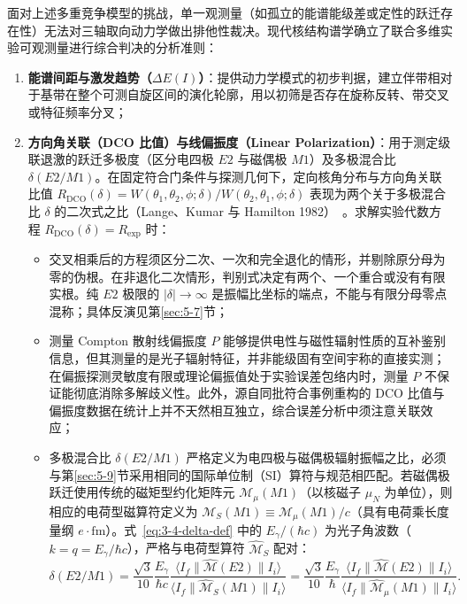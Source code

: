 面对上述多重竞争模型的挑战，单一观测量（如孤立的能谱能级差或定性的跃迁存在性）无法对三轴取向动力学做出排他性裁决。现代核结构谱学确立了联合多维实验可观测量进行综合判决的分析准则：
\begin{enumerate}
\item \textbf{能谱间距与激发趋势（$\Delta E(I)$）}：提供动力学模式的初步判据，建立伴带相对于基带在整个可测自旋区间的演化轮廓，用以初筛是否存在旋称反转、带交叉或特征频率分叉；
\item \textbf{方向角关联（DCO 比值）与线偏振度（Linear Polarization）}：用于测定级联退激的跃迁多极度（区分电四极 $E2$ 与磁偶极 $M1$）及多极混合比 $\delta(E2/M1)$。在固定符合门条件与探测几何下，定向核角分布与方向角关联比值 $R_{\text{DCO}}(\delta) = W(\theta_1, \theta_2, \phi; \delta) / W(\theta_2, \theta_1, \phi; \delta)$ 表现为两个关于多极混合比 $\delta$ 的二次式之比（Lange、Kumar 与 Hamilton 1982）~\cite{lange-kumar-hamilton-1982-multipole-admixtures}。求解实验代数方程 $R_{\text{DCO}}(\delta) = R_{\text{exp}}$ 时：
\begin{itemize}
\item 交叉相乘后的方程须区分二次、一次和完全退化的情形，并剔除原分母为零的伪根。在非退化二次情形，判别式决定有两个、一个重合或没有有限实根。纯 $E2$ 极限的 $|\delta|\to\infty$ 是振幅比坐标的端点，不能与有限分母零点混称；具体反演见第\ref{sec:5-7}节；
\item 测量 Compton 散射线偏振度 $P$ 能够提供电性与磁性辐射性质的互补鉴别信息，但其测量的是光子辐射特征，并非能级固有空间宇称的直接实测；在偏振探测灵敏度有限或理论偏振值处于实验误差包络内时，测量 $P$ 不保证能彻底消除多解歧义性。此外，源自同批符合事例重构的 DCO 比值与偏振度数据在统计上并不天然相互独立，综合误差分析中须注意关联效应；
\item 多极混合比 $\delta(E2/M1)$ 严格定义为电四极与磁偶极辐射振幅之比，必须与第\ref{sec:5-9}节采用相同的国际单位制（SI）算符与规范相匹配。若磁偶极跃迁使用传统的磁矩型约化矩阵元 $\mathcal{M}_\mu(M1)$（以核磁子 $\mu_N$ 为单位），则相应的电荷型磁算符定义为 $\mathcal{M}_S(M1) \equiv \mathcal{M}_\mu(M1)/c$（具有电荷乘长度量纲 $e\cdot\mathrm{fm}$）。式~\eqref{eq:3-4-delta-def} 中的 $E_\gamma/(\hbar c)$ 为光子角波数（$k = q = E_\gamma/\hbar c$），严格与电荷型算符 $\hat{\mathcal{M}}_S$ 配对：
\begin{equation}\label{eq:3-4-delta-def}
\delta(E2/M1) = \frac{\sqrt{3}}{10} \frac{E_\gamma}{\hbar c} \frac{\langle I_f \| \hat{\mathcal{M}}(E2) \| I_i \rangle}{\langle I_f \| \hat{\mathcal{M}}_S(M1) \| I_i \rangle} = \frac{\sqrt{3}}{10} \frac{E_\gamma}{\hbar} \frac{\langle I_f \| \hat{\mathcal{M}}(E2) \| I_i \rangle}{\langle I_f \| \hat{\mathcal{M}}_\mu(M1) \| I_i \rangle}.

\end{equation}
\end{itemize}
\end{enumerate}
